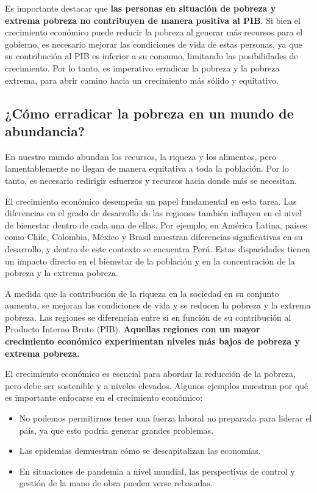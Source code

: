 \documentclass[
  letterpaper,
  DIV=11,
  numbers=noendperiod]{scrartcl}
\providecommand{\tightlist}{%
  \setlength{\itemsep}{0pt}\setlength{\parskip}{0pt}}\usepackage{longtable,booktabs,array}
\begin{document}
Es importante destacar que \textbf{las personas en situación de pobreza
y extrema pobreza no contribuyen de manera positiva al PIB}. Si bien el
crecimiento económico puede reducir la pobreza al generar más recursos
para el gobierno, es necesario mejorar las condiciones de vida de estas
personas, ya que su contribución al PIB es inferior a su consumo,
limitando las posibilidades de crecimiento. Por lo tanto, es imperativo
erradicar la pobreza y la pobreza extrema, para abrir camino hacia un
crecimiento más sólido y equitativo.

\hypertarget{cuxf3mo-erradicar-la-pobreza-en-un-mundo-de-abundancia}{%
\subsection{¿Cómo erradicar la pobreza en un mundo de
abundancia?}\label{cuxf3mo-erradicar-la-pobreza-en-un-mundo-de-abundancia}}

En nuestro mundo abundan los recursos, la riqueza y los alimentos, pero
lamentablemente no llegan de manera equitativa a toda la población. Por
lo tanto, es necesario redirigir esfuerzos y recursos hacia donde más se
necesitan.

El crecimiento económico desempeña un papel fundamental en esta tarea.
Las diferencias en el grado de desarrollo de las regiones también
influyen en el nivel de bienestar dentro de cada una de ellas. Por
ejemplo, en América Latina, países como Chile, Colombia, México y Brasil
muestran diferencias significativas en su desarrollo, y dentro de este
contexto se encuentra Perú. Estas disparidades tienen un impacto directo
en el bienestar de la población y en la concentración de la pobreza y la
extrema pobreza.

A medida que la contribución de la riqueza en la sociedad en su conjunto
aumenta, se mejoran las condiciones de vida y se reducen la pobreza y la
extrema pobreza. Las regiones se diferencian entre sí en función de su
contribución al Producto Interno Bruto (PIB). \textbf{Aquellas regiones
con un mayor crecimiento económico experimentan niveles más bajos de
pobreza y extrema pobreza.}

El crecimiento económico es esencial para abordar la reducción de la
pobreza, pero debe ser sostenible y a niveles elevados. Algunos ejemplos
muestran por qué es importante enfocarse en el crecimiento económico:

\begin{itemize}
\tightlist
\item
  No podemos permitirnos tener una fuerza laboral no preparada para
  liderar el país, ya que esto podría generar grandes problemas.
\item
  Las epidemias demuestran cómo se descapitalizan las economías.
\item
  En situaciones de pandemia a nivel mundial, las perspectivas de
  control y gestión de la mano de obra pueden verse rebasadas.
\end{itemize}
\end{document}
